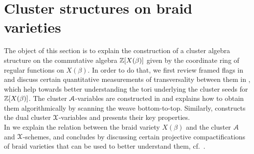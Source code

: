 \section{Cluster structures on braid varieties}\label{sec:braid_variety_cluster}

The object of this section is to explain the construction of a cluster algebra structure on the commutative algebra $\mathbb{Z}[X(\beta)]$ given by the coordinate ring of regular functions on $X(\beta)$. In order to do that, we first review framed flags in  and discuss certain quantitative measurements of transversality between them in , which help towards better understanding the tori underlying the cluster seeds for $\mathbb{Z}[X(\beta)]$. The cluster $\mathcal{A}$-variables are constructed in  and  explains how to obtain them algorithmically by scanning the weave bottom-to-top. Similarly,  constructs the dual cluster $\mathcal{X}$-variables and presents their key properties.\\

In  we explain the relation between the braid variety $X(\beta)$ and the cluster $\mathcal{A}$ and $\mathcal{X}$-schemes, and  concludes by discussing certain projective compactifications of braid varieties that can be used to better understand them, cf.~.\\

